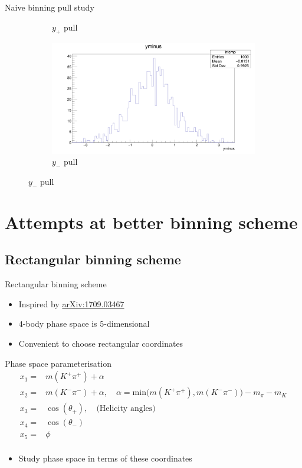 \documentclass{beamer}
\begin{document}
\begin{frame}{Naive binning pull study}
\begin{figure}
\begin{subfigure}{0.5\textwidth}
      \caption{$y_+$ pull}
    \end{subfigure}%
    \begin{subfigure}{0.5\textwidth}
      \includegraphics[width = 1.0\textwidth]{NaivePulls/yminus1K1K.png}
      \caption{$y_-$ pull}
    \end{subfigure}
  \end{figure}
\end{frame}

\section{Attempts at better binning scheme}
\subsection{Rectangular binning scheme}
\begin{frame}{Rectangular binning scheme}
  \begin{itemize}
    \item{Inspired by \href{https://arxiv.org/abs/1709.03467}{arXiv:1709.03467}}
    \item{$4$-body phase space is $5$-dimensional}
    \item{Convenient to choose rectangular coordinates}
  \end{itemize}
  \begin{block}{Phase space parameterisation}
    \begin{align*}
      x_1 =& m(K^+\pi^+) + \alpha \\
      x_2 =& m(K^-\pi^-) + \alpha, \quad \alpha = \text{min}\big(m(K^+\pi^+), m(K^-\pi^-)\big) - m_\pi - m_K \\
      x_3 =& \cos(\theta_+), \quad \text{(Helicity angles)} \\
      x_4 =& \cos(\theta_-) \\
      x_5 =& \phi \\
    \end{align*}
  \end{block}
  \begin{itemize}
    \item{Study phase space in terms of these coordinates}
  \end{itemize}
\end{frame}
\end{document}
